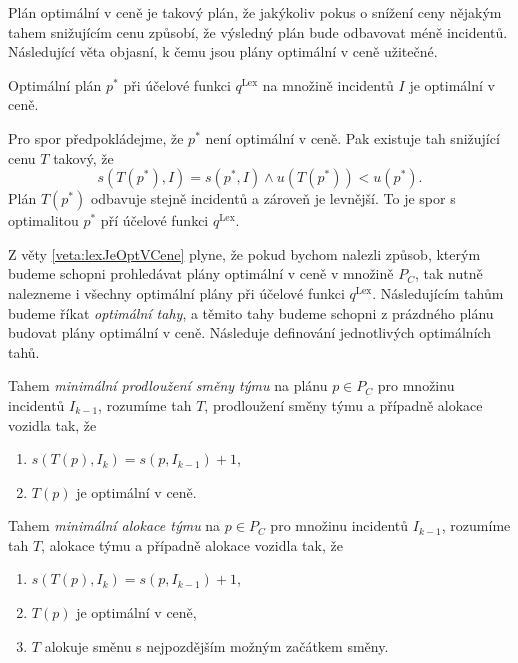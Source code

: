 Plán optimální v ceně je takový plán, že jakýkoliv pokus o snížení ceny nějakým tahem snižujícím cenu způsobí, že výsledný plán bude odbavovat méně incidentů.
Následující věta objasní, k čemu jsou plány optimální v ceně užitečné.
\begin{veta}\label{veta:lexJeOptVCene}
  Optimální plán $p^*$ při účelové funkci $q^{\text{Lex}}$ na množině incidentů $I$ je optimální v ceně.
\end{veta}
\begin{dukaz}
  Pro spor předpokládejme, že $p^*$ není optimální v ceně.
  Pak existuje tah snižující cenu $T$ takový, že
  \begin{equation*}
    s(T(p^*), I) = s(p^*, I) \land u(T(p^*)) < u(p^*).
  \end{equation*}
  Plán $T(p^*)$ odbavuje stejně incidentů a zároveň je levnější.
  To je spor s optimalitou $p^*$ pří účelové funkci $q^{\text{Lex}}$.
\end{dukaz}

Z věty \ref{veta:lexJeOptVCene} plyne, že pokud bychom nalezli způsob, kterým budeme schopni prohledávat plány optimální v ceně v množině $P_C$, tak nutně
nalezneme i všechny optimální plány při účelové funkci $q^{\text{Lex}}$.
Následujícím tahům budeme říkat \textit{optimální tahy}, a těmito tahy budeme schopni z prázdného plánu budovat plány optimální v ceně.
Následuje definování jednotlivých optimálních tahů.

\begin{definice}
  Tahem \textit{minimální prodloužení směny týmu} na plánu $p \in P_C$ pro množinu incidentů $I_{k-1}$, rozumíme tah $T$, prodloužení směny týmu a případně alokace vozidla tak, že
  \begin{enumerate}
    \item
      $s(T(p), I_{k}) = s(p, I_{k-1}) + 1$,
    \item
      $T(p)$ je optimální v ceně.
  \end{enumerate}
\end{definice}

\begin{definice}
  Tahem \textit{minimální alokace týmu} na $p \in P_C$ pro množinu incidentů $I_{k-1}$, rozumíme tah $T$, alokace týmu a případně alokace vozidla tak, že
  \begin{enumerate}
    \item
      $s(T(p), I_k) = s(p, I_{k-1}) + 1$,

    \item
      $T(p)$ je optimální v ceně,


    \item
      $T$ alokuje směnu s nejpozdějším možným začátkem směny.
  \end{enumerate}
\end{definice}

